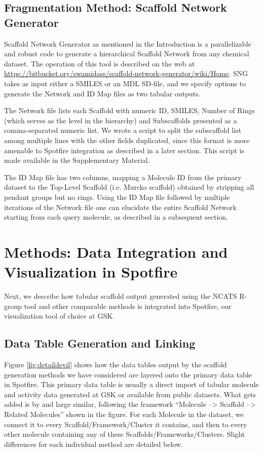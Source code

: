 \documentclass[journal=jacsat,manuscript=article]{achemso}
\newcommand*\fref[1]{Figure \ref{fig:#1}}
\begin{document}
\subsection{Fragmentation Method: Scaffold Network Generator}
\label{sec:SNG}
Scaffold Network Generator \cite{Matlock2013SNG} as mentioned in the Introduction is a parallelizable and robust code to generate a hierarchical Scaffold Network from any chemical dataset. The operation of this tool is described on the web at \url{https://bitbucket.org/swamidass/scaffold-network-generator/wiki/Home}. SNG takes as input either a SMILES or an MDL SD-file, and we specify options to generate the Network and ID Map files as two tabular outputs. 

The Network file lists each Scaffold with numeric ID, SMILES, Number of Rings (which serves as the level in the hierarchy) and Subscaffolds presented as a comma-separated numeric list. We wrote a script to split the subscaffold list among multiple lines with the other fields duplicated, since this format is more amenable to Spotfire integration as described in a later section.  This script is made available in the Supplementary Material.    

The ID Map file has two columns, mapping a Molecule ID from the primary dataset to the Top-Level Scaffold (i.e. Murcko scaffold) obtained by stripping all pendant groups but no rings. Using the ID Map file followed by multiple iterations of the Network file one can elucidate the entire Scaffold Network starting from each query molecule, as described in a subsequent section.

\section{Methods: Data Integration and Visualization in Spotfire}
\label{sec:methods2}

Next, we describe how tabular scaffold output generated using the NCATS R-group tool and other comparable methods is integrated into Spotfire, our visualization tool of choice at GSK.

\subsection{Data Table Generation and Linking}

\fref{detaildevil} shows how the data tables output by the scaffold generation methods we have considered are layered onto the primary data table in Spotfire. This primary data table is usually a direct import of tabular molecule and activity data generated at GSK or available from public datasets. What gets added is by and large similar, following the framework ``Molecule --> Scaffold --> Related Molecules'' shown in the figure. For each Molecule in the dataset, we connect it to every Scaffold/Framework/Cluster it contains, and then to every other molecule containing any of these Scaffolds/Frameworks/Clusters. Slight differences for each individual method are detailed below. 
\end{document}
